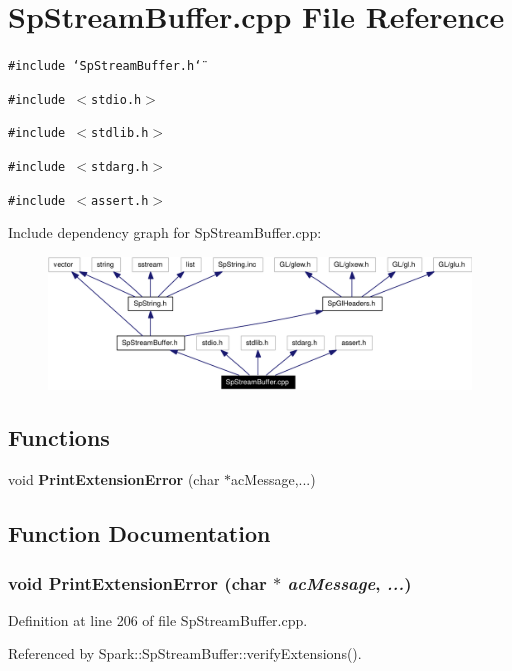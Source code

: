 \section{Sp\-Stream\-Buffer.cpp File Reference}
\label{SpStreamBuffer_8cpp}
{\tt \#include \char`\"{}Sp\-Stream\-Buffer.h\char`\"{}}\par
{\tt \#include $<$stdio.h$>$}\par
{\tt \#include $<$stdlib.h$>$}\par
{\tt \#include $<$stdarg.h$>$}\par
{\tt \#include $<$assert.h$>$}\par


Include dependency graph for Sp\-Stream\-Buffer.cpp:\begin{figure}[H]
\begin{center}
\leavevmode
\includegraphics[width=321pt]{SpStreamBuffer_8cpp__incl}
\end{center}
\end{figure}
\subsection*{Functions}
\begin{CompactItemize}
\item 
void {\bf Print\-Extension\-Error} (char $\ast$ac\-Message,...)
\end{CompactItemize}


\subsection{Function Documentation}
\subsubsection{\setlength{\rightskip}{0pt plus 5cm}void Print\-Extension\-Error (char $\ast$ {\em ac\-Message},  {\em ...})}\label{SpStreamBuffer_8cpp_a0}


Definition at line 206 of file Sp\-Stream\-Buffer.cpp.

Referenced by Spark::Sp\-Stream\-Buffer::verify\-Extensions().